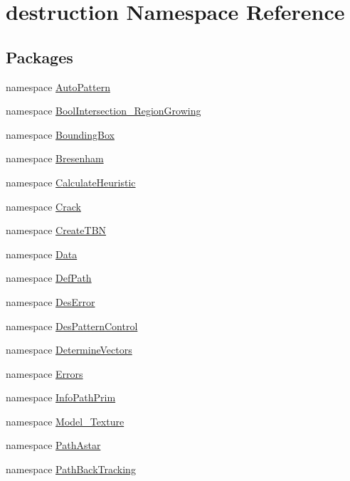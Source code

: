 \hypertarget{namespacedestruction}{\section{destruction Namespace Reference}
\label{namespacedestruction}
}
\subsection*{Packages}
\begin{DoxyCompactItemize}
\item 
namespace \hyperlink{namespacedestruction_1_1_auto_pattern}{Auto\-Pattern}
\item 
namespace \hyperlink{namespacedestruction_1_1_bool_intersection___region_growing}{Bool\-Intersection\-\_\-\-Region\-Growing}
\item 
namespace \hyperlink{namespacedestruction_1_1_bounding_box}{Bounding\-Box}
\item 
namespace \hyperlink{namespacedestruction_1_1_bresenham}{Bresenham}
\item 
namespace \hyperlink{namespacedestruction_1_1_calculate_heuristic}{Calculate\-Heuristic}
\item 
namespace \hyperlink{namespacedestruction_1_1_crack}{Crack}
\item 
namespace \hyperlink{namespacedestruction_1_1_create_t_b_n}{Create\-T\-B\-N}
\item 
namespace \hyperlink{namespacedestruction_1_1_data}{Data}
\item 
namespace \hyperlink{namespacedestruction_1_1_def_path}{Def\-Path}
\item 
namespace \hyperlink{namespacedestruction_1_1_des_error}{Des\-Error}
\item 
namespace \hyperlink{namespacedestruction_1_1_des_pattern_control}{Des\-Pattern\-Control}
\item 
namespace \hyperlink{namespacedestruction_1_1_determine_vectors}{Determine\-Vectors}
\item 
namespace \hyperlink{namespacedestruction_1_1_errors}{Errors}
\item 
namespace \hyperlink{namespacedestruction_1_1_info_path_prim}{Info\-Path\-Prim}
\item 
namespace \hyperlink{namespacedestruction_1_1_model___texture}{Model\-\_\-\-Texture}
\item 
namespace \hyperlink{namespacedestruction_1_1_path_astar}{Path\-Astar}
\item 
namespace \hyperlink{namespacedestruction_1_1_path_back_tracking}{Path\-Back\-Tracking}

\end{DoxyCompactItemize}

